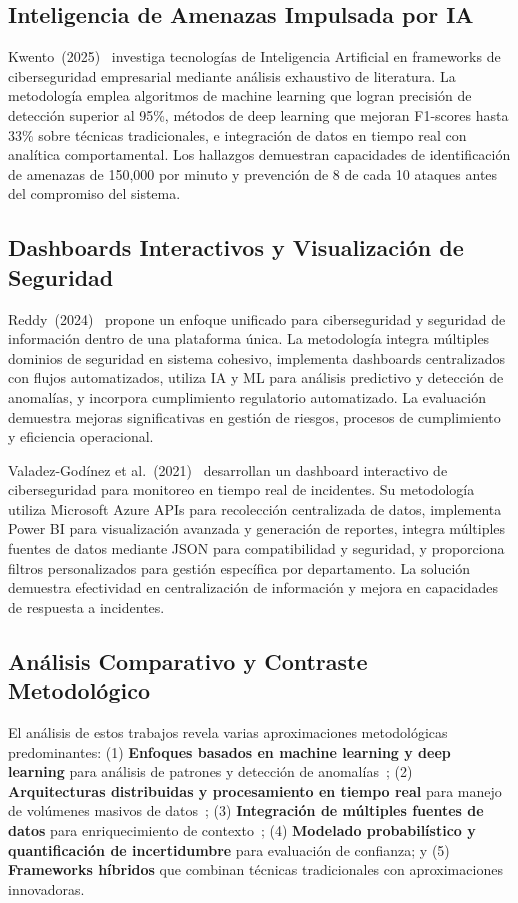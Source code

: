 \subsection{Inteligencia de Amenazas Impulsada por IA}

Kwento~(2025)~\cite{13} investiga tecnologías de Inteligencia Artificial en frameworks de ciberseguridad empresarial mediante análisis exhaustivo de literatura. La metodología emplea algoritmos de machine learning que logran precisión de detección superior al 95\%, métodos de deep learning que mejoran F1-scores hasta 33\% sobre técnicas tradicionales, e integración de datos en tiempo real con analítica comportamental. Los hallazgos demuestran capacidades de identificación de amenazas de 150,000 por minuto y prevención de 8 de cada 10 ataques antes del compromiso del sistema.

\subsection{Dashboards Interactivos y Visualización de Seguridad}

Reddy~(2024)~\cite{14} propone un enfoque unificado para ciberseguridad y seguridad de información dentro de una plataforma única. La metodología integra múltiples dominios de seguridad en sistema cohesivo, implementa dashboards centralizados con flujos automatizados, utiliza IA y ML para análisis predictivo y detección de anomalías, y incorpora cumplimiento regulatorio automatizado. La evaluación demuestra mejoras significativas en gestión de riesgos, procesos de cumplimiento y eficiencia operacional.

Valadez-Godínez et al.~(2021)~\cite{15} desarrollan un dashboard interactivo de ciberseguridad para monitoreo en tiempo real de incidentes. Su metodología utiliza Microsoft Azure APIs para recolección centralizada de datos, implementa Power BI para visualización avanzada y generación de reportes, integra múltiples fuentes de datos mediante JSON para compatibilidad y seguridad, y proporciona filtros personalizados para gestión específica por departamento. La solución demuestra efectividad en centralización de información y mejora en capacidades de respuesta a incidentes.

\subsection{Análisis Comparativo y Contraste Metodológico}

El análisis de estos trabajos revela varias aproximaciones metodológicas predominantes: (1) \textbf{Enfoques basados en machine learning y deep learning} para análisis de patrones y detección de anomalías~\cite{11,13}; (2) \textbf{Arquitecturas distribuidas y procesamiento en tiempo real} para manejo de volúmenes masivos de datos~\cite{6,7,8,9}; (3) \textbf{Integración de múltiples fuentes de datos} para enriquecimiento de contexto~\cite{10,14,15}; (4) \textbf{Modelado probabilístico y quantificación de incertidumbre} para evaluación de confianza; y (5) \textbf{Frameworks híbridos} que combinan técnicas tradicionales con aproximaciones innovadoras.

